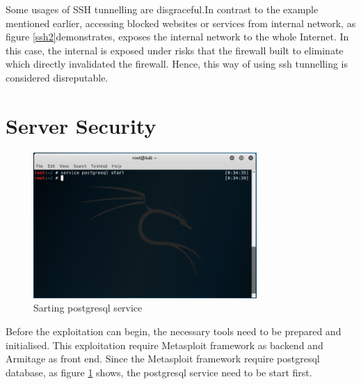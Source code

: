 \documentclass{article}
\begin{document}
Some usages of SSH tunnelling are disgraceful.In contrast to the example mentioned 
earlier, accessing blocked websites or services from internal network, 
as figure \ref{ssh2}demonstrates, exposes the internal network to the whole Internet. 
In this case, the internal is exposed under risks that the firewall built to eliminate which directly 
invalidated the firewall. Hence, this way of using ssh tunnelling is considered disreputable. 

\section{Server Security}
\label{sec:serversec}




\begin{figure}[H]
  \includegraphics[width=8.5cm]{kali1}
  \caption{Sarting postgresql service}
  \label{kali1}
\end{figure}

Before the exploitation can begin, the necessary tools need to be prepared and initialised.
This exploitation require Metasploit framework as backend and Armitage as front end. Since the 
Metasploit framework require postgresql database, as figure \ref{kali1} shows, 
the postgresql service need to be start first.
\end{document}
